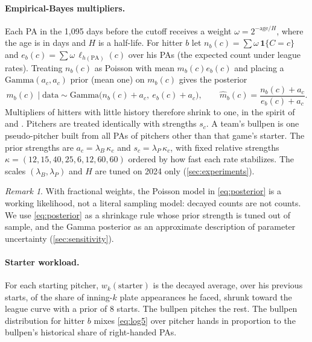 \documentclass[11pt]{article}
\theoremstyle{definition}
\theoremstyle{remark}
\newtheorem{remark}{Remark}
\newcommand{\one}{\mathbf{1}}
\begin{document}
\paragraph{Empirical-Bayes multipliers.} Each PA in the 1{,}095 days before the cutoff receives a weight
$\omega=2^{-\text{age}/H}$, where the age is in days and $H$ is a half-life. For hitter $b$ let
$n_b(c)=\sum\omega\,\one\{C=c\}$ and $e_b(c)=\sum\omega\,\ell_{h(\mathrm{PA})}(c)$ over his PAs (the
expected count under league rates). Treating $n_b(c)$ as Poisson with mean $m_b(c)e_b(c)$ and
placing a $\mathrm{Gamma}(a_c,a_c)$ prior (mean one) on $m_b(c)$ gives the posterior
\begin{equation}\label{eq:posterior}
m_b(c)\mid\text{data}\sim\mathrm{Gamma}\bigl(n_b(c)+a_c,\ e_b(c)+a_c\bigr),\qquad
\hat m_b(c)=\frac{n_b(c)+a_c}{e_b(c)+a_c}.
\end{equation}
Multipliers of hitters with little history therefore shrink to one, in the spirit of
\citet{efron1975} and \citet{brown2008}. Pitchers are treated identically with strengths $s_c$.
A team's bullpen is one pseudo-pitcher built from all PAs of pitchers other than that game's
starter. The prior strengths are $a_c=\lambda_B\,\kappa_c$ and $s_c=\lambda_P\,\kappa_c$, with fixed
relative strengths $\kappa=(12,15,40,25,6,12,60,60)$ ordered by how fast each rate stabilizes.
The scales $(\lambda_B,\lambda_P)$ and $H$ are tuned on 2024 only (\cref{sec:experiments}).

\begin{remark}
With fractional weights, the Poisson model in \eqref{eq:posterior} is a working likelihood, not
a literal sampling model: decayed counts are not counts. We use \eqref{eq:posterior} as a shrinkage
rule whose prior strength is tuned out of sample, and the Gamma posterior as an approximate
description of parameter uncertainty (\cref{sec:sensitivity}).
\end{remark}

\paragraph{Starter workload.} For each starting pitcher, $w_k(\text{starter})$ is the decayed average,
over his previous starts, of the share of inning-$k$ plate appearances he faced, shrunk toward the
league curve with a prior of 8 starts. The bullpen pitches the rest. The bullpen distribution for
hitter $b$ mixes \eqref{eq:log5} over pitcher hands in proportion to the bullpen's historical share
of right-handed PAs.
\end{document}
